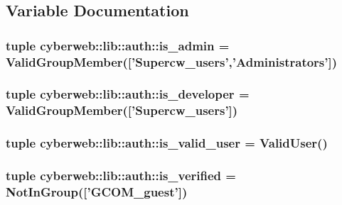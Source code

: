 \subsection{\-Variable \-Documentation}
\hypertarget{namespacecyberweb_1_1lib_1_1auth_a16da607061c9df3ef1f43e994bfc6d0b}{
\subsubsection[{is\-\_\-admin}]{\setlength{\rightskip}{0pt plus 5cm}tuple {\bf cyberweb\-::lib\-::auth\-::is\-\_\-admin} = {\bf \-Valid\-Group\-Member}(\mbox{[}'\-Supercw\-\_\-users','\-Administrators'\mbox{]})}}\label{namespacecyberweb_1_1lib_1_1auth_a16da607061c9df3ef1f43e994bfc6d0b}
\hypertarget{namespacecyberweb_1_1lib_1_1auth_a1ffe9d73617d0fea4cae7363b630a86e}{
\subsubsection[{is\-\_\-developer}]{\setlength{\rightskip}{0pt plus 5cm}tuple {\bf cyberweb\-::lib\-::auth\-::is\-\_\-developer} = {\bf \-Valid\-Group\-Member}(\mbox{[}'\-Supercw\-\_\-users'\mbox{]})}}\label{namespacecyberweb_1_1lib_1_1auth_a1ffe9d73617d0fea4cae7363b630a86e}
\hypertarget{namespacecyberweb_1_1lib_1_1auth_ad2b3b5f53350ca475a03adbae4755285}{
\subsubsection[{is\-\_\-valid\-\_\-user}]{\setlength{\rightskip}{0pt plus 5cm}tuple {\bf cyberweb\-::lib\-::auth\-::is\-\_\-valid\-\_\-user} = {\bf \-Valid\-User}()}}\label{namespacecyberweb_1_1lib_1_1auth_ad2b3b5f53350ca475a03adbae4755285}
\hypertarget{namespacecyberweb_1_1lib_1_1auth_a33409e23cfbddfbfe913fa47cbc93e56}{
\subsubsection[{is\-\_\-verified}]{\setlength{\rightskip}{0pt plus 5cm}tuple {\bf cyberweb\-::lib\-::auth\-::is\-\_\-verified} = {\bf \-Not\-In\-Group}(\mbox{[}'\-G\-C\-O\-M\-\_\-guest'\mbox{]})}}\label{namespacecyberweb_1_1lib_1_1auth_a33409e23cfbddfbfe913fa47cbc93e56}
